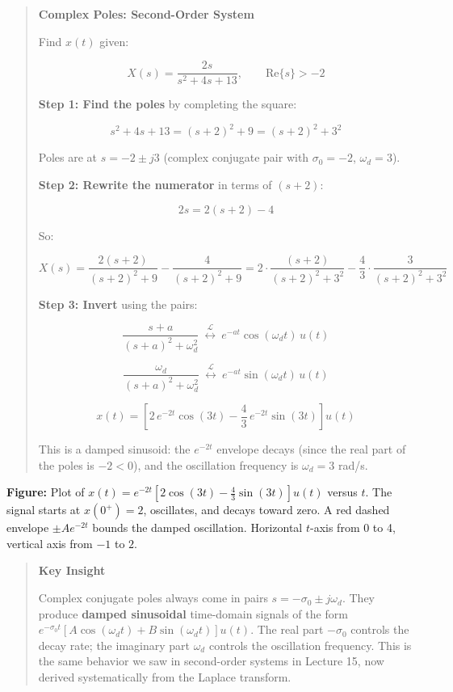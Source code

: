 \documentclass[11pt]{article}
\begin{document}
\begin{quote}
\textbf{Complex Poles: Second-Order System}

Find $x(t)$ given:

\[X(s) = \frac{2s}{s^2 + 4s + 13}, \qquad \text{Re}\{s\} > -2\]

\textbf{Step 1: Find the poles} by completing the square:

\[s^2 + 4s + 13 = (s+2)^2 + 9 = (s+2)^2 + 3^2\]

Poles are at $s = -2 \pm j3$ (complex conjugate pair with $\sigma_0 = -2$, $\omega_d = 3$).

\textbf{Step 2: Rewrite the numerator} in terms of $(s+2)$:

\[2s = 2(s+2) - 4\]

So:

\[X(s) = \frac{2(s+2)}{(s+2)^2 + 9} - \frac{4}{(s+2)^2 + 9} = 2 \cdot \frac{(s+2)}{(s+2)^2 + 3^2} - \frac{4}{3} \cdot \frac{3}{(s+2)^2 + 3^2}\]

\textbf{Step 3: Invert} using the pairs:

\[\frac{s+a}{(s+a)^2 + \omega_d^2} \ \overset{\mathcal{L}}{\longleftrightarrow}\ e^{-at} \cos(\omega_d t)\, u(t)\]

\[\frac{\omega_d}{(s+a)^2 + \omega_d^2} \ \overset{\mathcal{L}}{\longleftrightarrow}\ e^{-at} \sin(\omega_d t)\, u(t)\]

\[\boxed{x(t) = \left[2\, e^{-2t} \cos(3t) - \frac{4}{3}\, e^{-2t} \sin(3t)\right] u(t)}\]

This is a damped sinusoid: the $e^{-2t}$ envelope decays (since the real part of the poles is $-2 < 0$), and the oscillation frequency is $\omega_d = 3$ rad/s.
\end{quote}

\textbf{Figure:} Plot of $x(t) = e^{-2t}\left[2\cos(3t) - \frac{4}{3}\sin(3t)\right] u(t)$ versus $t$. The signal starts at $x(0^+) = 2$, oscillates, and decays toward zero. A red dashed envelope $\pm A e^{-2t}$ bounds the damped oscillation. Horizontal $t$-axis from 0 to 4, vertical axis from $-1$ to $2$.

\begin{quote}
\textbf{Key Insight}

Complex conjugate poles always come in pairs $s = -\sigma_0 \pm j\omega_d$. They produce \textbf{damped sinusoidal} time-domain signals of the form $e^{-\sigma_0 t}\left[A\cos(\omega_d t) + B\sin(\omega_d t)\right] u(t)$. The real part $-\sigma_0$ controls the decay rate; the imaginary part $\omega_d$ controls the oscillation frequency. This is the same behavior we saw in second-order systems in Lecture 15, now derived systematically from the Laplace transform.
\end{quote}
\end{document}
